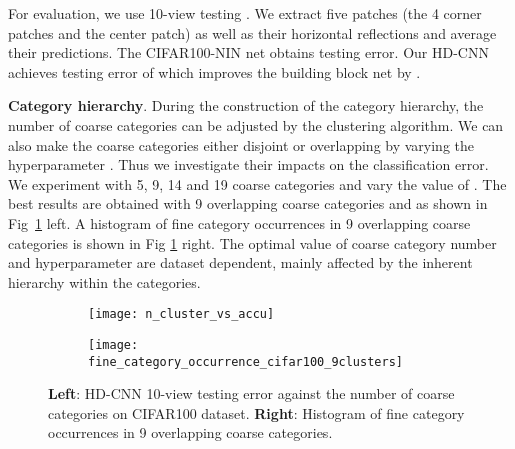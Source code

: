 \documentclass[10pt,twocolumn,letterpaper]{article}
\begin{document}
For evaluation, we use 10-view testing \cite{krizhevsky2012imagenet}. We extract five  patches (the 4 corner patches and the center patch) as well as their horizontal reflections and average their predictions. The CIFAR100-NIN net obtains  testing error. Our HD-CNN achieves testing error of  which improves the building block net by . 

\noindent \textbf{Category hierarchy}. 
During the construction of the category hierarchy, the number of coarse categories can be adjusted by the clustering algorithm. We can also make the coarse categories either disjoint or overlapping by varying the hyperparameter . Thus we investigate their impacts on the classification error. We experiment with 5, 9, 14 and 19 coarse categories and vary the value of . The best results are obtained with 9 overlapping coarse categories and  as shown in Fig~\ref{fig:cifar100_internal_comp} left. A histogram of fine category occurrences in 9 overlapping coarse categories is shown in Fig \ref{fig:cifar100_internal_comp} right. 
The optimal value of coarse category number and hyperparameter  are dataset dependent, mainly affected by the inherent hierarchy within the categories. 



\begin{figure}[h]
\vspace{-1em}
\centering
\begin{subfigure}{.30\textwidth}
  \centering
  \texttt{[image: n\_cluster\_vs\_accu]}
\end{subfigure}\begin{subfigure}{.18\textwidth}
  \centering
  \texttt{[image: fine\_category\_occurrence\_cifar100\_9clusters]}
\end{subfigure}
\caption{\textbf{Left}: HD-CNN 10-view testing error against the number of coarse categories on CIFAR100 dataset. \textbf{Right}: Histogram of fine category occurrences in 9 overlapping coarse categories.}
\vspace{-1em}
\label{fig:cifar100_internal_comp}
\end{figure}
\end{document}
